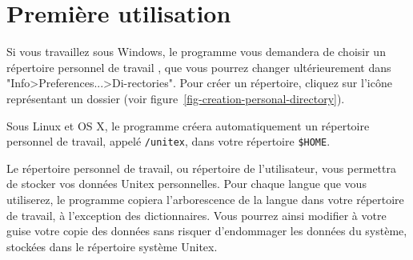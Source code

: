 










\section{Première utilisation}
\label{section-first-use}
Si vous travaillez sous Windows, le programme vous demandera de choisir un répertoire personnel de travail
, que vous pourrez changer ultérieurement dans
"Info>Preferences...>Di-rectories". Pour créer un répertoire, cliquez sur l’icône représentant un
dossier (voir figure~\ref{fig-creation-personal-directory}).

\bigskip
\noindent Sous Linux et OS X, le programme créera automatiquement un répertoire personnel de travail,
appelé \verb+/unitex+, dans votre répertoire \verb+$HOME+. 

\bigskip
\noindent Le répertoire personnel de travail, ou répertoire de l'utilisateur, vous permettra de stocker vos
données Unitex personnelles. Pour chaque langue que vous utiliserez, le
programme copiera l’arborescence de la langue dans votre répertoire de travail,
à l’exception des dictionnaires. Vous pourrez ainsi modifier à votre guise votre copie des données
sans risquer d’endommager les données du système, stockées dans le
répertoire système Unitex.



